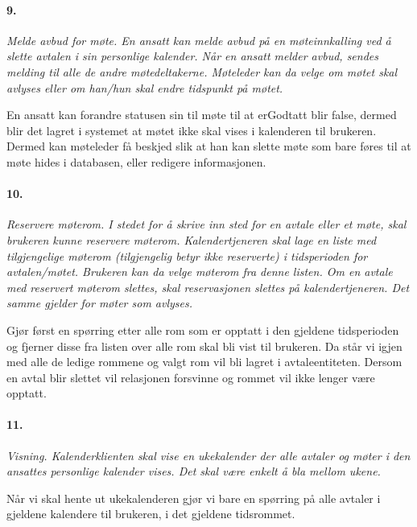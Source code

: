 \documentclass[titlepage]{article}
\begin{document}
\paragraph{9.}\textit{ Melde avbud for møte. En ansatt kan melde avbud på en møteinnkalling ved å slette avtalen i sin personlige kalender. Når en ansatt melder avbud, sendes melding til alle de andre møtedeltakerne. Møteleder kan da velge om møtet skal avlyses eller om
han/hun skal endre tidspunkt på møtet.}

En ansatt kan forandre statusen sin til møte til at erGodtatt blir false, dermed blir det lagret i systemet at møtet ikke skal vises i kalenderen til brukeren. Dermed kan møteleder få beskjed slik at han kan slette møte som bare føres til at møte hides i databasen, eller redigere informasjonen.










\paragraph{10.}\textit{ Reservere møterom. I stedet for å skrive inn sted for en avtale eller et møte, skal brukeren kunne reservere møterom. Kalendertjeneren skal lage en liste med
tilgjengelige møterom (tilgjengelig betyr ikke reserverte) i tidsperioden for
avtalen/møtet. Brukeren kan da velge møterom fra denne listen. Om en avtale med
reservert møterom slettes, skal reservasjonen slettes på kalendertjeneren. Det samme
gjelder for møter som avlyses.}

Gjør først en spørring etter alle rom som er opptatt i den gjeldene tidsperioden og fjerner disse fra listen over alle rom skal bli vist til brukeren. Da står vi igjen med alle de ledige rommene og valgt rom vil bli lagret i avtaleentiteten. Dersom en avtal blir slettet vil relasjonen forsvinne og rommet vil ikke lenger være opptatt.

\paragraph{11.}\textit{ Visning. Kalenderklienten skal vise en ukekalender der alle avtaler og møter i den ansattes personlige kalender vises. Det skal være enkelt å bla mellom ukene.}

Når vi skal hente ut ukekalenderen gjør vi bare en spørring på alle avtaler i gjeldene kalendere til brukeren, i det gjeldene tidsrommet.
\end{document}
